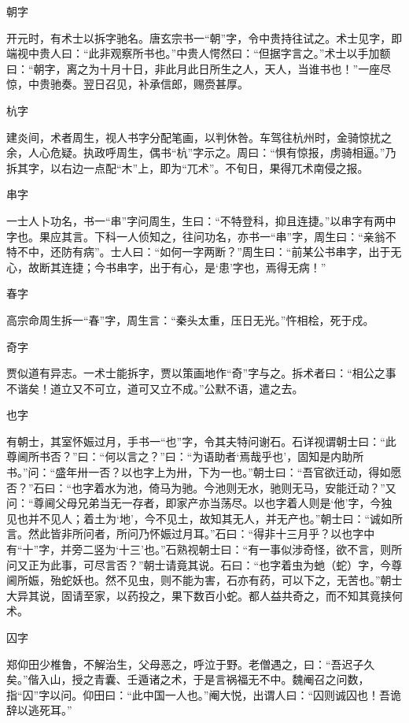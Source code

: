 \documentclass[a4paper,12pt,UTF8,twoside]{ctexbook}
\begin{document}
    朝字
    
    开元时，有术士以拆字驰名。唐玄宗书一“朝”字，令中贵持往试之。术士见字，即端视中贵人曰：“此非观察所书也。”中贵人愕然曰：“但据字言之。”术士以手加额曰：“朝字，离之为十月十日，非此月此日所生之人，天人，当谁书也！”一座尽惊，中贵驰奏。翌日召见，补承信郎，赐赍甚厚。
    
    杭字
    
    建炎间，术者周生，视人书字分配笔画，以判休咎。车驾往杭州时，金骑惊扰之余，人心危疑。执政呼周生，偶书“杭”字示之。周曰：“惧有惊报，虏骑相逼。”乃拆其字，以右边一点配“木”上，即为“兀术”。不旬日，果得兀术南侵之报。
    
    串字
    
    一士人卜功名，书一“串”字问周生，生曰：“不特登科，抑且连捷。”以串字有两中字也。果应其言。下科一人侦知之，往问功名，亦书一“串”字，周生曰：“亲翁不特不中，还防有病”。士人曰：“如何一字两断？”周生曰：“前某公书串字，出于无心，故断其连捷；今书串字，出于有心，是‘患’字也，焉得无病！”
    
    春字
    
    高宗命周生拆一“春”字，周生言：“秦头太重，压日无光。”忤相桧，死于戍。
    
    奇字
    
    贾似道有异志。一术士能拆字，贾以策画地作“奇”字与之。拆术者曰：“相公之事不谐矣！道立又不可立，道可又立不成。”公默不语，遣之去。
    
    也字
    
    有朝士，其室怀娠过月，手书一“也”字，令其夫特问谢石。石详视谓朝士曰：“此尊阃所书否？”曰：“何以言之？”曰：“为语助者‘焉哉乎也’，固知是内助所书。”问：“盛年卅一否？以也字上为卅，下为一也。”朝士曰：“吾官欲迁动，得如愿否？”石曰：“也字着水为池，倚马为驰。今池则无水，驰则无马，安能迁动？”又问：“尊阃父母兄弟当无一存者，即家产亦当荡尽。以也字着人则是‘他’字，今独见也并不见人；着土为‘地’，今不见土，故知其无人，并无产也。”朝士曰：“诚如所言。然此皆非所问者，所问乃怀娠过月耳。”石曰：“得非十三月乎？以也字中有“十”字，并旁二竖为‘十三’也。”石熟视朝士曰：“有一事似涉奇怪，欲不言，则所问又正为此事，可尽言否？”朝士请竟其说。石曰：“也字着虫为虵（蛇）字，今尊阃所娠，殆蛇妖也。然不见虫，则不能为害，石亦有药，可以下之，无苦也。”朝士大异其说，固请至家，以药投之，果下数百小蛇。都人益共奇之，而不知其竟挟何术。
    
    囚字
    
    郑仰田少椎鲁，不解治生，父母恶之，呼泣于野。老僧遇之，曰：“吾迟子久矣。”偕入山，授之青囊、壬遁诸之术，于是言祸福无不中。魏阉召之问数，指“囚”字以问。仰田曰：“此中国一人也。”阉大悦，出谓人曰：“囚则诚囚也！吾诡辞以逃死耳。”
    
\end{document}
